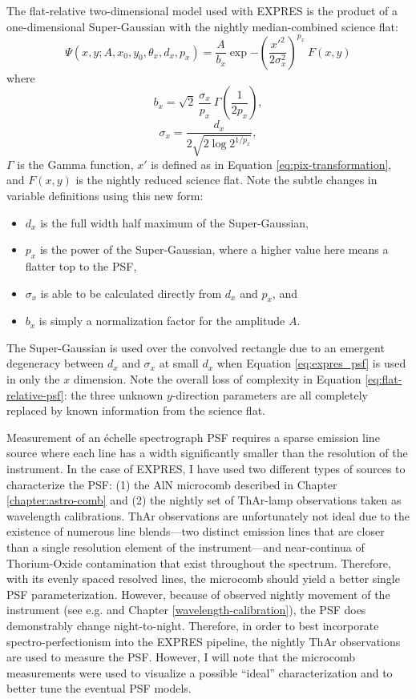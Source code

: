 The flat-relative two-dimensional model used with EXPRES is the product of a one-dimensional Super-Gaussian with the nightly median-combined science flat:
\begin{equation}
    \Psi(x, y; A, x_0, y_0, \theta_x, d_x, p_x) = \frac{A}{b_x} \exp{-\left(\frac{x'^2}{2\sigma_x^2}\right)^{p_x}}~F(x,y)
    \label{eq:flat-relative-psf}
\end{equation}
where
\begin{equation}
    b_x = \sqrt{2}~\frac{\sigma_x}{p_x}~\Gamma\left(\frac{1}{2 p_x}\right),
\end{equation}
\begin{equation}
    \sigma_x = \frac{d_x}{2\sqrt{2 \log{2}^{1/p_x}}},
\end{equation}
$\Gamma$ is the Gamma function, $x'$ is defined as in Equation \ref{eq:pix-transformation}, and $F(x,y)$ is the nightly reduced science flat. Note the subtle changes in variable definitions using this new form:
\begin{itemize}
    \item $d_x$ is the full width half maximum of the Super-Gaussian,
    \item $p_x$ is the power of the Super-Gaussian, where a higher value here means a flatter top to the PSF,
    \item $\sigma_x$ is able to be calculated directly from $d_x$ and $p_x$, and
    \item $b_x$ is simply a normalization factor for the amplitude $A$.
\end{itemize}
The Super-Gaussian is used over the convolved rectangle due to an emergent degeneracy between $d_x$ and $\sigma_x$ at small $d_x$ when Equation \ref{eq:expres_psf} is used in only the $x$ dimension. Note the overall loss of complexity in Equation \ref{eq:flat-relative-psf}: the three unknown $y$-direction parameters are all completely replaced by known information from the science flat.

Measurement of an \'{e}chelle spectrograph PSF requires a sparse emission line source where each line has a width significantly smaller than the resolution of the instrument. In the case of EXPRES, I have used two different types of sources to characterize the PSF: (1) the AlN microcomb described in Chapter \ref{chapter:astro-comb} and (2) the nightly set of ThAr-lamp observations taken as wavelength calibrations. ThAr observations are unfortunately not ideal due to the existence of numerous line blends---two distinct emission lines that are closer than a single resolution element of the instrument---and near-continua of Thorium-Oxide contamination that exist throughout the spectrum. Therefore, with its evenly spaced resolved lines, the microcomb should yield a better single PSF parameterization. However, because of observed nightly movement of the instrument (see e.g. \citet{blackman_performance_2020} and Chapter \ref{wavelength-calibration}), the PSF does demonstrably change night-to-night. Therefore, in order to best incorporate spectro-perfectionism into the EXPRES pipeline, the nightly ThAr observations are used to measure the PSF. However, I will note that the microcomb measurements were used to visualize a possible ``ideal'' characterization and to better tune the eventual PSF models.

